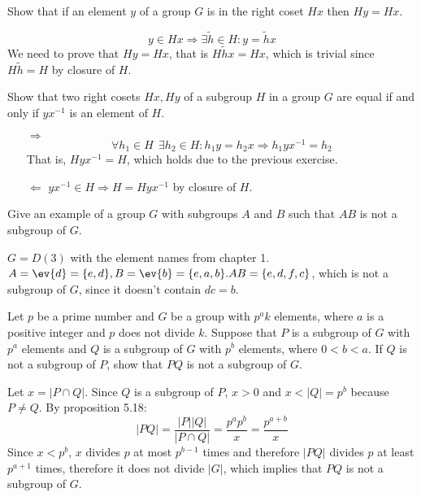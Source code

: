 \begin{exercise}
    Show that if an element \(y\) of a group \(G\) is in the right coset \(Hx\) then \(Hy = Hx\).
\end{exercise}
\begin{solution}
    \[y \in Hx \Rightarrow \exists \tilde{h} \in H : y = \tilde{h}x\]
    We need to prove that \(Hy = Hx\), that is \(H \tilde{h}x = Hx\), which is trivial since \(H \tilde{h} = H\) by closure of \(H\).
\end{solution}

\begin{exercise}
    Show that two right cosets \(Hx, Hy\) of a subgroup \(H\) in a group \(G\) are equal if and only if \(yx^{ - 1}\) is an element of \(H\).
\end{exercise}
\begin{solution}\itemfix
    \begin{itemize}
        \item [\(\Rightarrow\)]
              \[\forall h_1 \in H \ \ \exists h_2 \in H : h_1 y = h_2 x \Rightarrow h_1 yx^{ - 1} = h_2\]
              That is, \(Hyx^{ - 1} = H\), which holds due to the previous exercise.
        \item [\(\Leftarrow\)] \(yx^{ - 1} \in H \Rightarrow H = Hyx^{ - 1}\) by closure of \(H\).
    \end{itemize}
\end{solution}

\begin{exercise}
    Give an example of a group \(G\) with subgroups \(A\) and \(B\) such that \(AB\) is not a subgroup of \(G\).
\end{exercise}
\begin{solution}
    \(G = D(3)\) with the element names from chapter 1. \(A = \ev{d} = \{e, d\}, B = \ev{b} = \{e, a, b\}. AB = \{e, d, f, c\}\), which is not a subgroup of \(G\), since it doesn't contain \(dc = b\).
\end{solution}

\begin{exercise}
    Let \(p\) be a prime number and \(G\) be a group with \(p^a k\) elements, where \(a\) is a positive integer and \(p\) does not divide \(k\). Suppose that \(P\) is a subgroup of \(G\) with \(p^a\) elements and \(Q\) is a subgroup of \(G\) with \(p^b\) elements, where \(0 < b < a\). If \(Q\) is not a subgroup of \(P\), show that \(PQ\) is not a subgroup of \(G\).
\end{exercise}
\begin{solution}
    Let \(x = |P \cap Q|\). Since \(Q\) is a subgroup of \(P\), \(x > 0\) and \(x < |Q| = p^b\) because \(P \neq Q\). By proposition 5.18:
    \[|PQ| = \frac{|P||Q|}{|P \cap Q|} = \frac{p^a p^b}{x} = \frac{p^{a + b}}{x}\]
    Since \(x < p^b\), \(x\) divides \(p\) at most \(p^{b - 1}\) times and therefore \(|PQ|\) divides \(p\) at least \(p^{a + 1}\) times, therefore it does not divide \(|G|\), which implies that \(PQ\) is not a subgroup of \(G\).
\end{solution}

